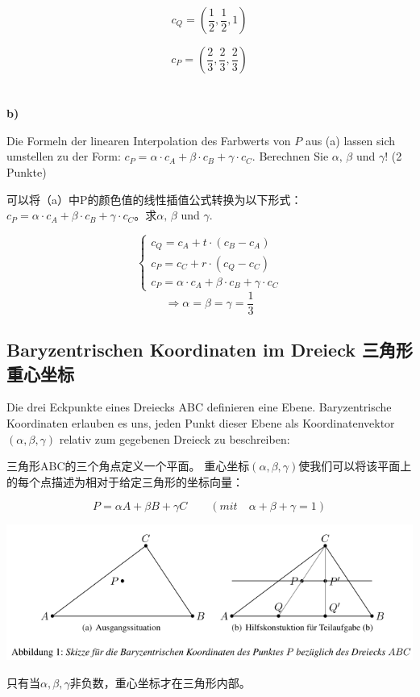 \documentclass[fleqn]{article}
\begin{document}
$$c_Q=(\frac{1}{2},\frac{1}{2},1)$$

$$c_P=(\frac{2}{3},\frac{2}{3},\frac{2}{3})$$
\\
\\
\textbf{b)}

Die Formeln der linearen Interpolation des Farbwerts von $P$ aus (a) lassen sich umstellen zu der Form:
$c_P=\alpha\cdot c_A+\beta\cdot c_B+\gamma\cdot c_C$. Berechnen Sie $\alpha,\,\beta$ und $\gamma$! (2 Punkte)

可以将（a）中P的颜色值的线性插值公式转换为以下形式：$c_P=\alpha\cdot c_A+\beta\cdot c_B+\gamma\cdot c_C$。求$\alpha,\,\beta$ und $\gamma$.

$$\left\{\begin{aligned}
    c_Q=c_A+t\cdot(c_B-c_A)\\
    c_P=c_C+r\cdot(c_Q-c_C)\\
    c_P=\alpha\cdot c_A+\beta\cdot c_B+\gamma\cdot c_C
\end{aligned}\right.$$
$$\Rightarrow \alpha=\beta=\gamma=\frac{1}{3}$$

\subsection{Baryzentrischen Koordinaten im Dreieck 三角形重心坐标}

Die drei Eckpunkte eines Dreiecks ABC definieren eine Ebene. Baryzentrische Koordinaten erlauben es uns, jeden Punkt dieser Ebene als Koordinatenvektor $(\alpha,\beta,\gamma)$ relativ zum gegebenen Dreieck zu beschreiben:

三角形ABC的三个角点定义一个平面。 重心坐标$(\alpha,\beta,\gamma)$使我们可以将该平面上的每个点描述为相对于给定三角形的坐标向量：

$$P=\alpha A + \beta B + \gamma C \qquad (mit\quad \alpha + \beta + \gamma =1)$$

\begin{center}
    \includegraphics[scale=0.6]{11.png}
\end{center}

只有当$\alpha,\beta,\gamma$非负数，重心坐标才在三角形内部。
\end{document}
